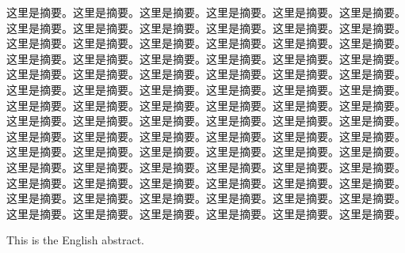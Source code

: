 \begin{MUCAbstract}
    这里是摘要。这里是摘要。这里是摘要。这里是摘要。这里是摘要。这里是摘要。这里是摘要。这里是摘要。这里是摘要。这里是摘要。这里是摘要。这里是摘要。这里是摘要。这里是摘要。这里是摘要。这里是摘要。这里是摘要。这里是摘要。这里是摘要。这里是摘要。这里是摘要。这里是摘要。这里是摘要。这里是摘要。这里是摘要。这里是摘要。这里是摘要。这里是摘要。这里是摘要。这里是摘要。这里是摘要。这里是摘要。这里是摘要。这里是摘要。这里是摘要。这里是摘要。这里是摘要。这里是摘要。这里是摘要。这里是摘要。这里是摘要。这里是摘要。
    这里是摘要。这里是摘要。这里是摘要。这里是摘要。这里是摘要。这里是摘要。这里是摘要。这里是摘要。这里是摘要。这里是摘要。这里是摘要。这里是摘要。这里是摘要。这里是摘要。这里是摘要。这里是摘要。这里是摘要。这里是摘要。这里是摘要。这里是摘要。这里是摘要。这里是摘要。这里是摘要。这里是摘要。这里是摘要。这里是摘要。这里是摘要。这里是摘要。这里是摘要。这里是摘要。这里是摘要。这里是摘要。这里是摘要。这里是摘要。这里是摘要。这里是摘要。这里是摘要。这里是摘要。这里是摘要。这里是摘要。这里是摘要。这里是摘要。
\end{MUCAbstract}

\newpage{}

\begin{MUCENAbstract}
This is the English abstract.
\end{MUCENAbstract}